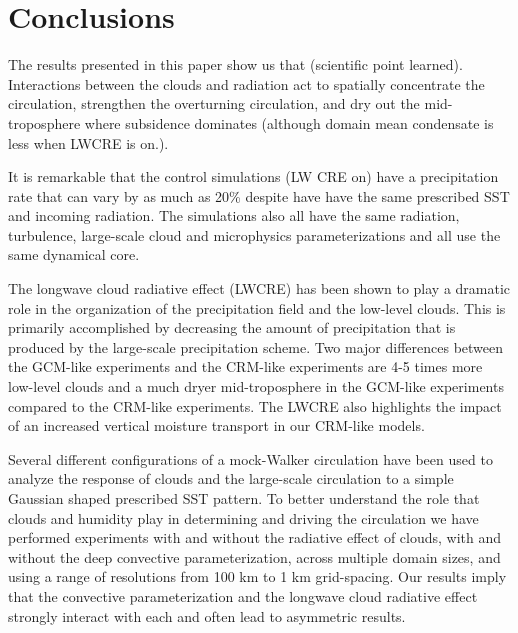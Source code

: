 \documentclass[11pt]{article}   	%
\begin{document}
%


\section{Conclusions}

The results presented in this paper show us that (scientific point learned).    Interactions between the clouds and radiation
act to spatially concentrate the circulation, strengthen the overturning circulation, and dry out the mid-troposphere where 
subsidence dominates (although domain mean condensate is less when LWCRE is on.).  

It is remarkable that the control simulations (LW CRE on) have a precipitation rate  that can vary by as much as 
20\% despite have have the same prescribed SST and incoming radiation.  The simulations also all have the same radiation,
turbulence, large-scale cloud and microphysics parameterizations and all use the same dynamical core.    

The longwave cloud radiative effect (LWCRE) has been shown to play a dramatic role in the organization of the precipitation
field and the low-level clouds.  This is primarily accomplished by decreasing the amount of precipitation that is produced 
by the large-scale precipitation scheme.  Two major differences between the GCM-like experiments and the CRM-like 
experiments are 4-5 times more low-level clouds and a much dryer mid-troposphere in the GCM-like experiments compared 
to the CRM-like experiments.  The LWCRE also highlights the impact of an increased vertical moisture transport 
in our CRM-like models.  

Several different configurations of a mock-Walker circulation have been used to analyze the response of clouds and the 
large-scale circulation to a simple Gaussian shaped prescribed SST pattern.  To better understand the role that clouds
and humidity play in determining and driving the circulation we have performed experiments with and without the radiative
effect of clouds, with and without the deep convective parameterization, across multiple domain sizes,  
and using a range of resolutions from 100 km to 1 km grid-spacing.  Our results imply that the convective 
parameterization and the longwave cloud radiative effect strongly interact with each and often lead to 
asymmetric results.   
\end{document}
